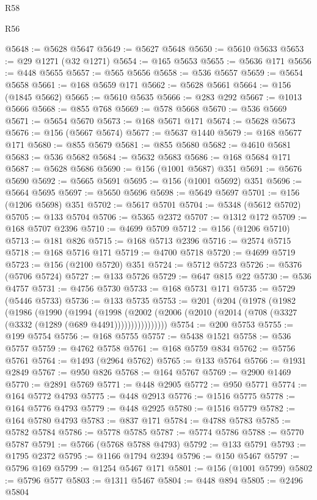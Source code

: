 \begin{lexlean}{R58}
\begin{lexlean}{R56}
\begin{coremodule}
{{{{{{{{{{{{{{{{{{{{{{{{{{{{{{{{{{{{{{{{{{{{{{{{{{{{{{{{{{{{{{{{{{{{{{{{{{{{{{{{{{{{{{{{{{{{{{{{{{{{{{{{{{{{{{{{{{{{{{{{{{{{{{{{{{{{{{{{{{{{{{{{{{{{{{{{{{{{{{{{{{{{{{{{{{{{{{{{{{{{{{{{{{{{{{{{{{{{{{{{{{{{{{{{{{{@5648 := @5628 @5647
@5649 := @5627 @5648
@5650 := @5610 @5633
@5653 := @29 @1271 (@32 @1271)
@5654 := @165 @5653
@5655 := @5636 @171
@5656 := @448 @5655
@5657 := @565 @5656
@5658 := @536 @5657
@5659 := @5654 @5658
@5661 := @168 @5659 @171
@5662 := @5628 @5661
@5664 := @156 (@1845 @5662)
@5665 := @5610 @5635
@5666 := @283 @292
@5667 := @1013 @5666
@5668 := @855 @768
@5669 := @578 @5668
@5670 := @536 @5669
@5671 := @5654 @5670
@5673 := @168 @5671 @171
@5674 := @5628 @5673
@5676 := @156 (@5667 @5674)
@5677 := @5637 @1440
@5679 := @168 @5677 @171
@5680 := @855 @5679
@5681 := @855 @5680
@5682 := @4610 @5681
@5683 := @536 @5682
@5684 := @5632 @5683
@5686 := @168 @5684 @171
@5687 := @5628 @5686
@5690 := @156 (@1001 @5687) @351
@5691 := @5676 @5690
@5692 := @5665 @5691
@5695 := @156 (@1001 @5692) @351
@5696 := @5664 @5695
@5697 := @5650 @5696
@5698 := @5649 @5697
@5701 := @156 (@1206 @5698) @351
@5702 := @5617 @5701
@5704 := @5348 (@5612 @5702)
@5705 := @133 @5704
@5706 := @5365 @2372
@5707 := @1312 @172
@5709 := @168 @5707 @2396
@5710 := @4699 @5709
@5712 := @156 (@1206 @5710)
@5713 := @181 @826
@5715 := @168 @5713 @2396
@5716 := @2574 @5715
@5718 := @168 @5716 @171
@5719 := @4700 @5718
@5720 := @4699 @5719
@5723 := @156 (@2100 @5720) @351
@5724 := @5712 @5723
@5726 := @5376 (@5706 @5724)
@5727 := @133 @5726
@5729 := @647 @815 @22
@5730 := @536 @4757
@5731 := @4756 @5730
@5733 := @168 @5731 @171
@5735 := @5729 (@5446 @5733)
@5736 := @133 @5735
@5753 := @201
    (@204
      (@1978
        (@1982
          (@1986
            (@1990
              (@1994
                (@1998
                  (@2002 (@2006 (@2010 (@2014 (@708 (@3327 (@3332 (@1289 (@689 @4491))))))))))))))))
@5754 := @200 @5753
@5755 := @199 @5754
@5756 := @168 @5755
@5757 := @5438 @1521
@5758 := @536 @5757
@5759 := @4762 @5758
@5761 := @168 @5759 @834
@5762 := @5756 @5761
@5764 := @1493 (@2964 @5762)
@5765 := @133 @5764
@5766 := @1931 @2849
@5767 := @950 @826
@5768 := @164 @5767
@5769 := @2900 @1469
@5770 := @2891 @5769
@5771 := @448 @2905
@5772 := @950 @5771
@5774 := @164 @5772 @4793
@5775 := @448 @2913
@5776 := @1516 @5775
@5778 := @164 @5776 @4793
@5779 := @448 @2925
@5780 := @1516 @5779
@5782 := @164 @5780 @4793
@5783 := @837 @171
@5784 := @4788 @5783
@5785 := @5782 @5784
@5786 := @5778 @5785
@5787 := @5774 @5786
@5788 := @5770 @5787
@5791 := @5766 (@5768 @5788 @4793)
@5792 := @133 @5791
@5793 := @1795 @2372
@5795 := @1166 @1794 @2394
@5796 := @150 @5467
@5797 := @5796 @169
@5799 := @1254 @5467 @171
@5801 := @156 (@1001 @5799)
@5802 := @5796 @577
@5803 := @1311 @5467
@5804 := @448 @894
@5805 := @2496 @5804
}}}}}}}}}}}}}}}}}}}}}}}}}}}}}}}}}}}}}}}}}}}}}}}}}}}}}}}}}}}}}}}}}}}}}}}}}}}}}}}}}}}}}}}}}}}}}}}}}}}}}}}}}}}}}}}}}}}}}}}}}}}}}}}}}}}}}}}}}}}}}}}}}}}}}}}}}}}}}}}}}}}}}}}}}}}}}}}}}}}}}}}}}}}}}}}}}}}}}}}}}}}}}}}}}}}
\end{coremodule}
\end{lexlean}
\end{lexlean}
